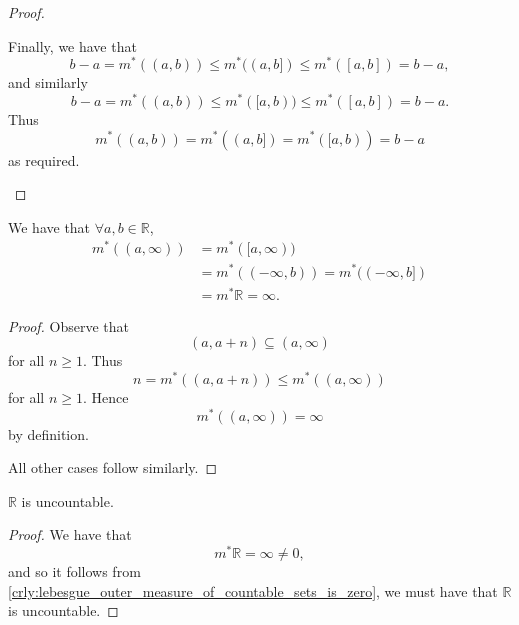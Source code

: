 \documentclass[notoc,notitlepage]{tufte-book}
\begin{document}
\begin{proof}
\begin{enumerate}
      Finally, we have that
      \begin{equation*}
        b - a = m^*((a, b)) \leq m^*((a, b]) \leq m^*([a, b]) = b - a,
      \end{equation*}
      and similarly
      \begin{equation*}
        b - a = m^*((a, b)) \leq m^*([a, b)) \leq m^*([a, b]) = b - a.
      \end{equation*}
      Thus
      \begin{equation*}
        m^*((a, b)) = m^*((a, b]) = m^*([a, b)) = b - a
      \end{equation*}
      as required.
  \end{enumerate}
\end{proof}

\begin{propo}\label{propo:lom_of_infinite_intervals}
  We have that $\forall a, b \in \mathbb{R}$,
  \begin{align*}
    m^*((a, \infty)) &= m^*([a, \infty)) \\
                     &= m^*((-\infty, b)) = m^*((-\infty, b]) \\
                     &= m^* \mathbb{R} = \infty.
  \end{align*}
\end{propo}

\begin{proof}
  Observe that
  \begin{equation*}
    (a, a + n) \subseteq (a, \infty)
  \end{equation*}
  for all $n \geq 1$. Thus
  \begin{equation*}
    n = m^*((a, a + n)) \leq m^*((a, \infty))
  \end{equation*}
  for all $n \geq 1$. Hence
  \begin{equation*}
    m^*((a, \infty)) = \infty
  \end{equation*}
  by definition.

  All other cases follow similarly.
\end{proof}

\begin{crly}\label{crly:uncountability_of_r}
  $\mathbb{R}$ is uncountable.
\end{crly}

\begin{proof}
  We have that
  \begin{equation*}
    m^* \mathbb{R} = \infty \neq 0,
  \end{equation*}
  and so it follows from
  \cref{crly:lebesgue_outer_measure_of_countable_sets_is_zero}, we must have
  that $\mathbb{R}$ is uncountable.
\end{proof}
\end{document}
